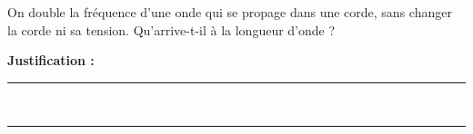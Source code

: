 On double la fréquence d'une onde qui se propage dans une corde, sans changer la corde ni sa tension. Qu'arrive-t-il à la longueur d'onde ?

\choices

\noindent\textbf{Justification :} \hrulefill \\[2.5ex]
\rule{\linewidth}{0.4pt} \\[2.5ex]
\rule{\linewidth}{0.4pt}
\vfill
